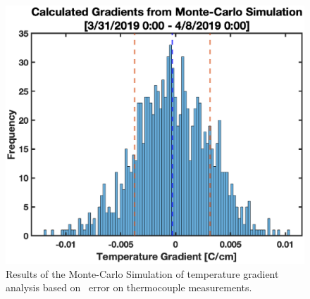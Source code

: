  \begin{figure}[H]
    \centering
    \includegraphics[width=0.7\linewidth]{figures/Uncertainty/MC_Grad.eps}
    \caption{Results of the Monte-Carlo Simulation of temperature gradient analysis based on \isostd \  error on thermocouple measurements.}
    \label{fig:MC_Grad}
 \end{figure}

